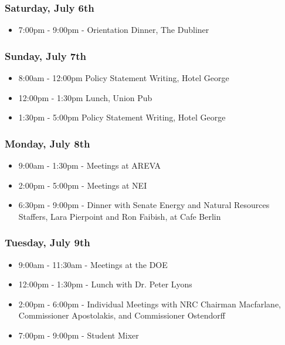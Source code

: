 

\subsubsection*{Saturday, July 6th}
\begin{itemize}
  \item 7:00pm - 9:00pm - Orientation Dinner, The Dubliner
\end{itemize}

\subsubsection*{Sunday, July 7th}
\begin{itemize}
  \item 8:00am - 12:00pm Policy Statement Writing, Hotel George
  \item 12:00pm - 1:30pm Lunch, Union Pub
  \item 1:30pm - 5:00pm Policy Statement Writing, Hotel George
\end{itemize}

\subsubsection*{Monday, July 8th}
\begin{itemize}
  \item 9:00am - 1:30pm - Meetings at AREVA
  \item 2:00pm - 5:00pm - Meetings at NEI
  \item 6:30pm - 9:00pm - Dinner with Senate Energy and Natural Resources
    Staffers, Lara Pierpoint and Ron Faibish, at Cafe Berlin
\end{itemize}

\subsubsection*{Tuesday, July 9th}
\begin{itemize}
  \item 9:00am - 11:30am - Meetings at the DOE
  \item 12:00pm - 1:30pm - Lunch with Dr. Peter Lyons
  \item 2:00pm - 6:00pm - Individual Meetings with NRC Chairman Macfarlane,
    Commissioner Apostolakis, and Commissioner Ostendorff
  \item 7:00pm - 9:00pm - Student Mixer
\end{itemize}

